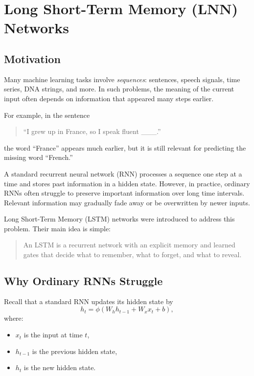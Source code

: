 \section{Long Short-Term Memory (LNN) Networks}
\label{sec:lstm}

\subsection{Motivation}

Many machine learning tasks involve \emph{sequences}: sentences, speech signals, time series, DNA strings, and more. In such problems, the meaning of the current input often depends on information that appeared many steps earlier.

For example, in the sentence
\begin{quote}
``I grew up in France, so I speak fluent \_\_\_.''
\end{quote}
the word ``France'' appears much earlier, but it is still relevant for predicting the missing word ``French.''

A standard recurrent neural network (RNN) processes a sequence one step at a time and stores past information in a hidden state. However, in practice, ordinary RNNs often struggle to preserve important information over long time intervals. Relevant information may gradually fade away or be overwritten by newer inputs.

Long Short-Term Memory (LSTM) networks were introduced to address this problem. Their main idea is simple:

\begin{quote}
An LSTM is a recurrent network with an explicit memory and learned gates that decide what to remember, what to forget, and what to reveal.
\end{quote}

\subsection{Why Ordinary RNNs Struggle}

Recall that a standard RNN updates its hidden state by
\[
h_t = \phi(W_h h_{t-1} + W_x x_t + b),
\]
where:
\begin{itemize}
    \item \(x_t\) is the input at time \(t\),
    \item \(h_{t-1}\) is the previous hidden state,
    \item \(h_t\) is the new hidden state.
\end{itemize}

